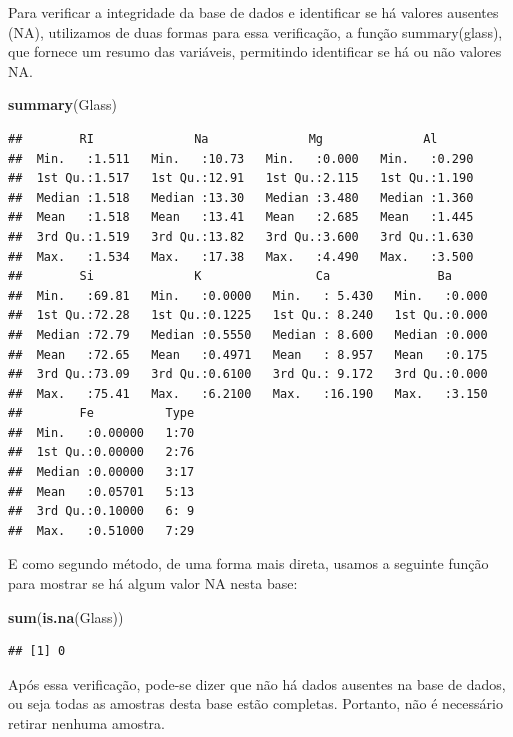\documentclass[
]{article}
\newenvironment{Shaded}{\begin{snugshade}}{\end{snugshade}}
\newcommand{\FunctionTok}[1]{\textcolor[rgb]{0.13,0.29,0.53}{\textbf{#1}}}
\newcommand{\NormalTok}[1]{#1}
\begin{document}
Para verificar a integridade da base de dados e identificar se há
valores ausentes (NA), utilizamos de duas formas para essa verificação,
a função summary(glass), que fornece um resumo das variáveis, permitindo
identificar se há ou não valores NA.

\begin{Shaded}
\begin{Highlighting}[]
\FunctionTok{summary}\NormalTok{(Glass)}
\end{Highlighting}
\end{Shaded}

\begin{verbatim}
##        RI              Na              Mg              Al       
##  Min.   :1.511   Min.   :10.73   Min.   :0.000   Min.   :0.290  
##  1st Qu.:1.517   1st Qu.:12.91   1st Qu.:2.115   1st Qu.:1.190  
##  Median :1.518   Median :13.30   Median :3.480   Median :1.360  
##  Mean   :1.518   Mean   :13.41   Mean   :2.685   Mean   :1.445  
##  3rd Qu.:1.519   3rd Qu.:13.82   3rd Qu.:3.600   3rd Qu.:1.630  
##  Max.   :1.534   Max.   :17.38   Max.   :4.490   Max.   :3.500  
##        Si              K                Ca               Ba       
##  Min.   :69.81   Min.   :0.0000   Min.   : 5.430   Min.   :0.000  
##  1st Qu.:72.28   1st Qu.:0.1225   1st Qu.: 8.240   1st Qu.:0.000  
##  Median :72.79   Median :0.5550   Median : 8.600   Median :0.000  
##  Mean   :72.65   Mean   :0.4971   Mean   : 8.957   Mean   :0.175  
##  3rd Qu.:73.09   3rd Qu.:0.6100   3rd Qu.: 9.172   3rd Qu.:0.000  
##  Max.   :75.41   Max.   :6.2100   Max.   :16.190   Max.   :3.150  
##        Fe          Type  
##  Min.   :0.00000   1:70  
##  1st Qu.:0.00000   2:76  
##  Median :0.00000   3:17  
##  Mean   :0.05701   5:13  
##  3rd Qu.:0.10000   6: 9  
##  Max.   :0.51000   7:29
\end{verbatim}

E como segundo método, de uma forma mais direta, usamos a seguinte
função para mostrar se há algum valor NA nesta base:

\begin{Shaded}
\begin{Highlighting}[]
\FunctionTok{sum}\NormalTok{(}\FunctionTok{is.na}\NormalTok{(Glass))}
\end{Highlighting}
\end{Shaded}

\begin{verbatim}
## [1] 0
\end{verbatim}

Após essa verificação, pode-se dizer que não há dados ausentes na base
de dados, ou seja todas as amostras desta base estão completas.
Portanto, não é necessário retirar nenhuma amostra.
\end{document}
